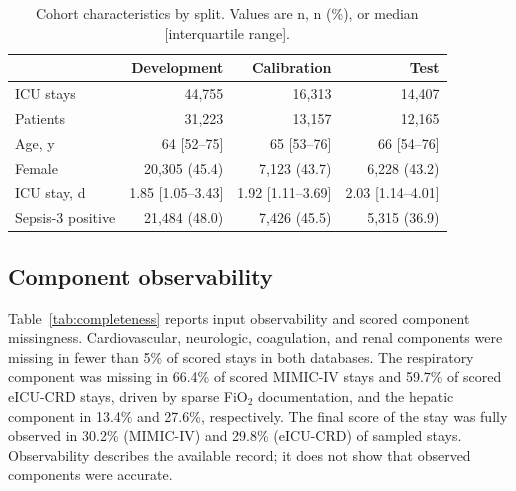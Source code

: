 \documentclass[journal]{IEEEtran}
\begin{document}
\begin{table}[t]
\centering
\caption{Cohort characteristics by split. Values are n, n (\%), or median
[interquartile range].}
\label{tab:chars}
\footnotesize
\setlength{\tabcolsep}{3pt}
\begin{tabular}{@{}lrrr@{}}
\toprule
 & Development & Calibration & Test \\
\midrule
ICU stays & 44,755 & 16,313 & 14,407 \\
Patients & 31,223 & 13,157 & 12,165 \\
Age, y & 64 [52--75] & 65 [53--76] & 66 [54--76] \\
Female & 20,305 (45.4) & 7,123 (43.7) & 6,228 (43.2) \\
ICU stay, d & 1.85 [1.05--3.43] & 1.92 [1.11--3.69] & 2.03 [1.14--4.01] \\
Sepsis-3 positive & 21,484 (48.0) & 7,426 (45.5) & 5,315 (36.9) \\
\bottomrule
\end{tabular}
\end{table}

\subsection{Component observability}

Table~\ref{tab:completeness} reports input observability and scored
component missingness. Cardiovascular, neurologic, coagulation, and renal
components were missing in fewer than 5\% of scored stays in both databases.
The respiratory component was missing in 66.4\% of scored MIMIC-IV stays and
59.7\% of scored eICU-CRD stays, driven by sparse FiO$_2$ documentation, and
the hepatic component in 13.4\% and 27.6\%, respectively. The final score
of the stay was fully observed in 30.2\% (MIMIC-IV) and 29.8\% (eICU-CRD)
of sampled stays. Observability describes the available record; it
does not show that observed components were accurate.
\end{document}
